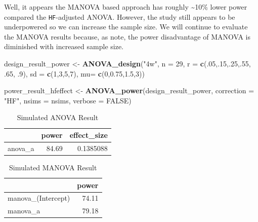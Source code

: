 \documentclass[]{book}
\newenvironment{Shaded}{\begin{snugshade}}{\end{snugshade}}
\newcommand{\DataTypeTok}[1]{\textcolor[rgb]{0.13,0.29,0.53}{#1}}
\newcommand{\DecValTok}[1]{\textcolor[rgb]{0.00,0.00,0.81}{#1}}
\newcommand{\FloatTok}[1]{\textcolor[rgb]{0.00,0.00,0.81}{#1}}
\newcommand{\KeywordTok}[1]{\textcolor[rgb]{0.13,0.29,0.53}{\textbf{#1}}}
\newcommand{\NormalTok}[1]{#1}
\newcommand{\OtherTok}[1]{\textcolor[rgb]{0.56,0.35,0.01}{#1}}
\newcommand{\StringTok}[1]{\textcolor[rgb]{0.31,0.60,0.02}{#1}}
\begin{document}
Well, it appears the MANOVA based approach has roughly \textasciitilde{}10\% lower power compared the \texttt{HF}-adjusted ANOVA. However, the study still appears to be underpowered so we can increase the sample size. We will continue to evaluate the MANOVA results because, as \citet{algina1997detecting} note, the power disadvantage of MANOVA is diminished with increased sample size.

\begin{Shaded}
\begin{Highlighting}[]
\NormalTok{design_result_power <-}\StringTok{ }\KeywordTok{ANOVA_design}\NormalTok{(}\StringTok{"4w"}\NormalTok{,}
                              \DataTypeTok{n =} \DecValTok{29}\NormalTok{,}
                              \DataTypeTok{r =} \KeywordTok{c}\NormalTok{(.}\DecValTok{05}\NormalTok{,.}\DecValTok{15}\NormalTok{,.}\DecValTok{25}\NormalTok{,.}\DecValTok{55}\NormalTok{, }\FloatTok{.65}\NormalTok{, }\FloatTok{.9}\NormalTok{),}
                              \DataTypeTok{sd =} \KeywordTok{c}\NormalTok{(}\DecValTok{1}\NormalTok{,}\DecValTok{3}\NormalTok{,}\DecValTok{5}\NormalTok{,}\DecValTok{7}\NormalTok{),}
                              \DataTypeTok{mu=} \KeywordTok{c}\NormalTok{(}\DecValTok{0}\NormalTok{,}\FloatTok{0.75}\NormalTok{,}\FloatTok{1.5}\NormalTok{,}\DecValTok{3}\NormalTok{))}

\NormalTok{power_result_hfeffect <-}\StringTok{ }\KeywordTok{ANOVA_power}\NormalTok{(design_result_power, }\DataTypeTok{correction =} \StringTok{"HF"}\NormalTok{,}
                                     \DataTypeTok{nsims =}\NormalTok{ nsims, }\DataTypeTok{verbose =} \OtherTok{FALSE}\NormalTok{)}
\end{Highlighting}
\end{Shaded}

\begin{table}[!h]

\caption{\label{tab:unnamed-chunk-189}Simulated ANOVA Result}
\centering
\begin{tabular}{l|r|r}
\hline
  & power & effect\_size\\
\hline
anova\_a & 84.69 & 0.1385088\\
\hline
\end{tabular}
\end{table}
\begin{table}[!h]

\caption{\label{tab:unnamed-chunk-190}Simulated MANOVA Result}
\centering
\begin{tabular}{l|r}
\hline
  & power\\
\hline
manova\_(Intercept) & 74.11\\
\hline
manova\_a & 79.18\\
\hline
\end{tabular}
\end{table}
\end{document}
